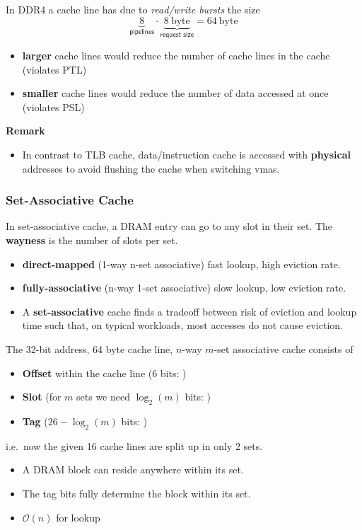 In DDR4 a cache line has due to \textit{read/write bursts} the size
\noindent\begin{equation*}
    \underbrace{8}_{\textsf{pipelines}}\cdot \underbrace{8~\mathrm{byte}}_{\textsf{request size}} = 64 ~\mathrm{byte}
\end{equation*}

\begin{itemize}
    \item \textbf{larger} cache lines would reduce the number of cache lines in the cache (violates PTL)
    \item \textbf{smaller} cache lines would reduce the number of data accessed at once (violates PSL)
\end{itemize}

\newpar{}
\textbf{Remark}
\begin{itemize}
    \item In contrast to TLB cache, data/instruction cache is accessed with \textbf{physical} addresses to avoid flushing the cache when switching vmas.
\end{itemize}

\subsubsection{Set-Associative Cache}
In set-associative cache, a DRAM entry can go to any slot in their set. The \textbf{wayness} is the number of slots per set.

\begin{itemize}
    \item \textbf{direct-mapped} (1-way n-set associative) fast lookup, high eviction rate. 
    \item \textbf{fully-associative} (n-way 1-set associative) slow lookup, low eviction rate.
    \item A \textbf{set-associative} cache finds a tradeoff between risk of eviction and lookup time such that, on typical workloads, most accesses do not cause eviction.
\end{itemize}

\newpar{}

The 32-bit address, 64 byte cache line, $n$-way $m$-set associative cache consists of
\begin{itemize}
    \item \textbf{Offset} within the cache line (6 bits: )
    \item \textbf{Slot} (for $m$ sets we need $\log_2(m)$ bits: )
    \item \textbf{Tag} ($26-\log_2(m)$ bits: )
\end{itemize}
i.e.\ now the given 16 cache lines are split up in only 2 sets. 
\begin{itemize}
    \item A DRAM block can reside anywhere within its set.
    \item The tag bits fully determine the block within its set.
    \item $\mathcal{O}(n)$ for lookup
\end{itemize}

